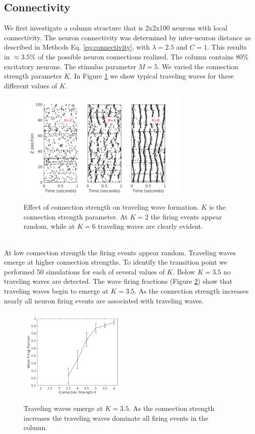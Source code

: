 \documentclass[a4paper,11pt]{article}
\begin{document}
\subsection{Connectivity}
We first investigate a column structure that is 2x2x100 neurons with local connectivity. 
The neuron connectivity was determined by inter-neuron distance as described in Methods Eq. \ref{eq:connectivity}, with $\lambda=2.5$ and $C=1$.
This results in $\approx 3.5\%$ of the possible neuron connections realized.  
The column contains $80\%$ excitatory neurons.
The stimulus parameter $M=5$.
We varied the connection strength parameter $K$.
In Figure \ref{fig:strength_effect} we show typical traveling waves for three different values of $K$.
\begin{figure}[!htb]
 \caption{Effect of connection strength on traveling wave formation. $K$ is the connection strength parameter. At $K=2$ the firing events appear random, while at $K=6$ traveling waves are clearly evident.}
 \centering
   \includegraphics[width=0.75\textwidth]{fig/ConnectionStrengthWaves}  
 \label{fig:strength_effect}
\end{figure}
\\
At low connection strength the firing events appear random.
Traveling waves emerge at higher connection strengths. 
To identify the transition point we performed 50 simulations for each of several values of $K$.
Below $K=3.5$ no traveling waves are detected.
The wave firing fractions (Figure \ref{fig:conn_fraction}) show that traveling waves begin to emerge at $K=3.5$.
As the connection strength increases nearly all neuron firing events are associated with traveling waves. 
\begin{figure}[!htb]
 \caption{Traveling waves emerge at $K=3.5$. As the connection strength increases the traveling waves dominate all firing events in the column.}
 \centering
   \includegraphics[width=0.5\textwidth]{fig/ConnectionStrengthWaveFraction}  
 \label{fig:conn_fraction}
\end{figure}
\end{document}
